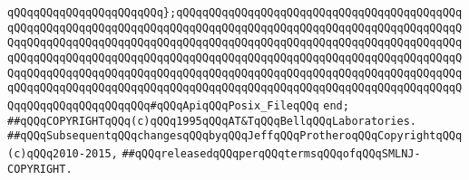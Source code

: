 \verb|qQQqqQQqqQQqqQQqqQQqqQQq};qQQqqQQqqQQqqQQqqQQqqQQqqQQqqQQqqQQqqQQqqQQqqQQqqQQqqQQqqQQqqQQqqQQqqQQqqQQqqQQqqQQqqQQqqQQqqQQqqQQqqQQqqQQqqQQqqQQqqQQqqQQqqQQqqQQqqQQqqQQqqQQqqQQqqQQqqQQqqQQqqQQqqQQqqQQqqQQqqQQqqQQqqQQqqQQqqQQqqQQqqQQqqQQqqQQqqQQqqQQqqQQqqQQqqQQqqQQqqQQqqQQqqQQqqQQqqQQqqQQqqQQqqQQqqQQqqQQqqQQqqQQqqQQqqQQqqQQqqQQqqQQqqQQqqQQqqQQqqQQqqQQqqQQqqQQqqQQqqQQqqQQqqQQqqQQqqQQqqQQqqQQqqQQqqQQqqQQqqQQqqQQqqQQqqQQqqQQqqQQqqQQqqQQqqQQqqQQq#qQQqApiqQQqPosix_FileqQQq|\newline
\verb|end;|\newline
\newline
\newline
\verb|##qQQqCOPYRIGHTqQQq(c)qQQq1995qQQqAT&TqQQqBellqQQqLaboratories.|\newline
\verb|##qQQqSubsequentqQQqchangesqQQqbyqQQqJeffqQQqProtheroqQQqCopyrightqQQq(c)qQQq2010-2015,|\newline
\verb|##qQQqreleasedqQQqperqQQqtermsqQQqofqQQqSMLNJ-COPYRIGHT.|\newline

